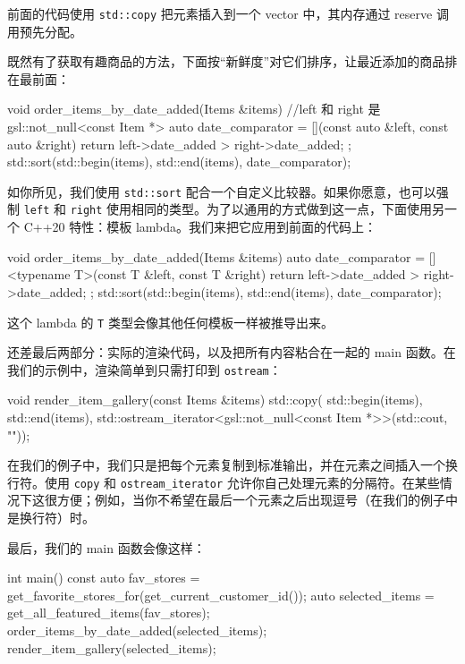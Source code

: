前面的代码使用 \texttt{std::copy} 把元素插入到一个 vector 中，其内存通过 reserve 调用预先分配。

既然有了获取有趣商品的方法，下面按“新鲜度”对它们排序，让最近添加的商品排在最前面：

\begin{codebox}[cpp]
void order_items_by_date_added(Items &items) {
    //left 和 right 是 gsl::not_null<const Item *>
    auto date_comparator = [](const auto &left, const auto &right) {
        return left->date_added > right->date_added;
    };
    std::sort(std::begin(items), std::end(items), date_comparator);
}
\end{codebox}

\label{idx:492}
\label{idx:493}
如你所见，我们使用 \texttt{std::sort} 配合一个自定义比较器。如果你愿意，也可以强制 \texttt{left} 和 \texttt{right} 使用相同的类型。为了以通用的方式做到这一点，下面使用另一个 C++20 特性：模板 lambda。我们来把它应用到前面的代码上：

\begin{codebox}[cpp]
void order_items_by_date_added(Items &items) {
    auto date_comparator = []<typename T>(const T &left, const T &right) {
        return left->date_added > right->date_added;
    };
    std::sort(std::begin(items), std::end(items), date_comparator);
}
\end{codebox}

这个 lambda 的 \texttt{T} 类型会像其他任何模板一样被推导出来。

还差最后两部分：实际的渲染代码，以及把所有内容粘合在一起的 main 函数。在我们的示例中，渲染简单到只需打印到 \texttt{ostream}：

\begin{codebox}[cpp]
void render_item_gallery(const Items &items) {
    std::copy(
        std::begin(items), std::end(items),
        std::ostream_iterator<gsl::not_null<const Item *>>(std::cout, "\n"));
}
\end{codebox}

在我们的例子中，我们只是把每个元素复制到标准输出，并在元素之间插入一个换行符。使用 \texttt{copy} 和 \texttt{ostream\_\allowbreak{}iterator} 允许你自己处理元素的分隔符。在某些情况下这很方便；例如，当你不希望在最后一个元素之后出现逗号（在我们的例子中是换行符）时。

最后，我们的 main 函数会像这样：

\begin{codebox}[text]
int main() {
    const auto fav_stores = get_favorite_stores_for(get_current_customer_id());
    auto selected_items = get_all_featured_items(fav_stores);
    order_items_by_date_added(selected_items);
    render_item_gallery(selected_items);
}
\end{codebox}

